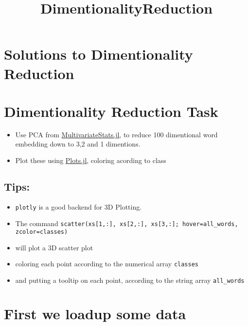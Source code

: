 \documentclass[11pt]{article}
\title{DimentionalityReduction}
\begin{document}
    
    
    \maketitle
    
    

    
    \section{Solutions to Dimentionality
Reduction}\label{solutions-to-dimentionality-reduction}

\section{Dimentionality Reduction
Task}\label{dimentionality-reduction-task}

\begin{itemize}
\itemsep1pt\parskip0pt
\item
  Use PCA from
  \href{https://github.com/JuliaStats/MultivariateStats.jl}{MultivariateStats.jl},
  to reduce 100 dimentional word embedding down to 3,2 and 1 dimentions.
\item
  Plot these using
  \href{https://github.com/tbreloff/Plots.jl}{Plots.jl}, coloring
  acording to class
\end{itemize}

\subsection{Tips:}\label{tips}

\begin{itemize}
\itemsep1pt\parskip0pt
\item
  \texttt{plotly} is a good backend for 3D Plotting.
\item
  The command
  \texttt{scatter(xs{[}1,:{]}, xs{[}2,:{]}, xs{[}3,:{]}; hover=all\_words, zcolor=classes)}
\item
  will plot a 3D scatter plot
\item
  coloring each point according to the numerical array \texttt{classes}
\item
  and putting a tooltip on each point, according to the string array
  \texttt{all\_words}
\end{itemize}

    \section{First we loadup some data}\label{first-we-loadup-some-data}
\end{document}
